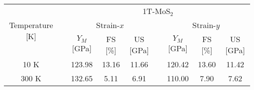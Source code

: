 \documentclass[a4paper,fleqn]{cas-sc}
\begin{document}
\begin{table*}[]
		\begin{tabular}{clccclccc}
			\hline
			\multicolumn{1}{c}{\multirow{3}{*}{Temperature [K]}} & \multicolumn{1}{l}{} &                                                                                                      \multicolumn{7}{c}{1T-MoS$_2$}                                                                                                       \\ \cline{3-9}
			                  \multicolumn{1}{c}{}                   & \multicolumn{1}{l}{} &                                     \multicolumn{3}{c}{ Strain-$x$}                                      & \multicolumn{1}{l}{} &                                      \multicolumn{3}{c}{Strain-$y$}                                      \\ \cline{3-5}\cline{7-9}
			                  \multicolumn{1}{c}{}                   & \multicolumn{1}{l}{} & \multicolumn{1}{c}{$Y_M$ {[}GPa{]}} & \multicolumn{1}{c}{FS {[}\%{]}} & \multicolumn{1}{c}{US {[}GPa{]}} & \multicolumn{1}{l}{} & \multicolumn{1}{c}{$Y_M$ {[}GPa{]}} & \multicolumn{1}{c}{FS {[}\%{]}} & \multicolumn{1}{c}{US {[}GPa{]}} \\ \cline{1-1}\cline{3-5}\cline{7-9}
			                          10 K                            &                      &               123.98                &              13.16              &              11.66               &                      &               120.42                &              13.60              &              11.42               \\
			                \multicolumn{1}{c}{300 K}                 & \multicolumn{1}{l}{} &     \multicolumn{1}{c}{132.65}      &    \multicolumn{1}{c}{5.11}     &     \multicolumn{1}{c}{6.91}     & \multicolumn{1}{l}{} &     \multicolumn{1}{c}{110.00}      &    \multicolumn{1}{c}{7.90}     &     \multicolumn{1}{c}{7.62}
		\end{tabular}



\end{table*}
\end{document}

